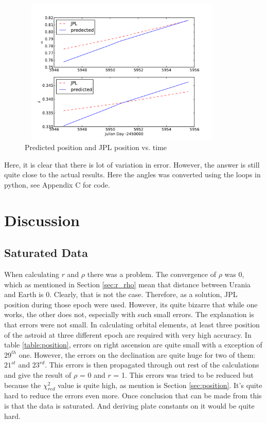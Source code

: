 \documentclass[a4paper,12pt]{article}
\begin{document}
\begin{figure}[H]
\centering
	\includegraphics [angle=0,height=7cm,width=10cm]{pic/predicted.pdf} 
\caption{Predicted position and JPL position vs. time}
\label{fig:orbit}
\end{figure}
Here, it is clear that there is lot of variation in error. However, the answer is still quite close to the actual results. Here the angles  was converted using the loops in python, see Appendix C for code.

\section{Discussion}
\label{sec:discuss}
\subsection{Saturated Data}
\label{sec:saturated}
When calculating $r$ and $\rho$ there was a problem. The convergence of $\rho$ was 0, which as mentioned in Section \ref{sec:r_rho} mean that distance between Urania and Earth is 0. Clearly, that is not the case. Therefore, as a solution, JPL position during those epoch were used. However, its quite bizarre that while one works, the other does not, especially with such small errors. The explanation is that errors were not small. In calculating orbital elements, at least three position of the astroid at three different epoch are required with very high accuracy. In table \ref{table:position}, errors on right ascension are quite small with a exception of $29^{th}$ one. However, the errors on the declination are quite huge for two of them: $21^{st}$ and $23^{rd}$. This errors is then propagated through out rest of the calculations and give the result of $\rho$ = 0 and $r$ = 1. This errors was tried to be reduced but because the $\chi_{red}^2$ value is quite high, as mention is Section \ref{sec:position}. It's quite hard to reduce the errors even more. Once conclusion that can be made from this is that the data is saturated. And deriving plate constants on it would be quite hard. 
\end{document}
